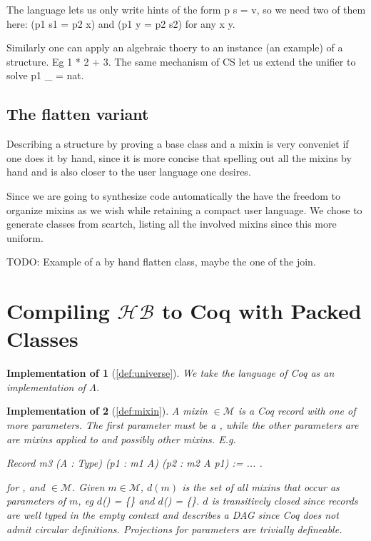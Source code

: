 \documentclass[a4paper,UKenglish,cleveref, autoref]{lipics-v2019}
\newcommand{\HB}{\ensuremath{\mathcal{HB}}}
\newcommand{\Lang}{\ensuremath{\Lambda}}
\newcommand{\mixin}{mixin}
\newcommand{\mixins}{mixins}
\newcommand{\M}{\ensuremath{\mathcal{M}}}
\newcommand{\depx}{\ensuremath{d}}
\theoremstyle{implem}
\newtheorem*{implementation}{Implementation of}
\theoremstyle{implem}
\theoremstyle{axiom}
\theoremstyle{abscommand}
\theoremstyle{command}
\begin{document}
The language lets us only write hints of the form p s = v, so we need two
of them here: (p1 s1 = p2 x) and (p1 y = p2 s2) for any x y.

Similarly one can apply an algebraic thoery to an instance (an example)
of a structure. Eg 1 * 2 + 3. The same mechanism of CS let us
extend the unifier to solve p1 \_ = nat.

\subsection{The flatten variant}

Describing a structure by proving a base class and a \mixin{} is very conveniet
if one does it by hand, since it is more concise that spelling out all the
\mixins{} by hand and is also closer to the user language one desires.

Since we are going to synthesize code automatically the have the freedom
to organize \mixins{} as we wish while retaining a compact user language.
We chose to generate classes from scartch, listing all the involved
\mixins{} since this more uniform.

TODO: Example of a by hand flatten class, maybe the one of the join.

\section{Compiling \HB{} to Coq with Packed Classes}\label{sec:compilation}

\begin{implementation}[\autoref{def:universe}]
We take the language of Coq as an implementation of \Lang{}.
\end{implementation}

\begin{implementation}[\autoref{def:mixin}]
A \mixin{}  \(\in \M{}\) is a Coq record with one of more parameters.
The first parameter must be a , while the other parameters are
are \mixins{} applied to  and possibly other \mixins{}. E.g.
\begin{coqcode}
Record m3 (A : Type) (p1 : m1 A) (p2 : m2 A p1) := { ... }.
\end{coqcode}
for ,  and  \(\in \M{}\).
Given \(m \in \M{}\), \(\depx{}(m)\) is the set of all
\mixins{} that occur as parameters of \(m\), eg
\depx{}() = \{\} and \depx{}() = \{\}.
\depx{} is transitively closed since records are well typed
in the empty context and describes a DAG since Coq does not
admit circular definitions.
Projections for parameters are trivially defineable.
\end{implementation}
\end{document}
